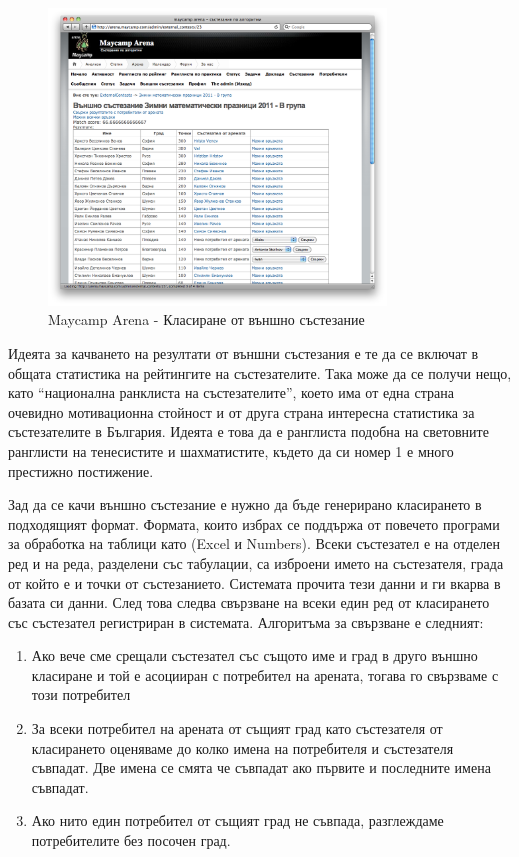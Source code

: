 \documentclass[a4paper,12pt]{article}
\begin{document}
  \begin{figure}[ht]
    \begin{center}
      \includegraphics[width=0.8\textwidth]{maycamp_arena_external_ranklist.png}
    \end{center}
    \caption{Maycamp Arena - Класиране от външно състезание}
    \label{arena_external_ranklist}
  \end{figure}
  
  Идеята за качването на резултати от външни състезания е те да се включат в общата статистика на рейтингите на състезателите. Така може да се получи нещо, като ``национална ранклиста на състезателите'', което има от една страна очевидно мотивационна стойност и от друга страна интересна статистика за състезателите в България. Идеята е това да е ранглиста подобна на световните ранглисти на тенесистите и шахматистите, където да си номер 1 е много престижно постижение.
  
  Зад да се качи външно състезание е нужно да бъде генерирано класирането в подходящият формат. Формата, които избрах се поддържа от повечето програми за обработка на таблици като (Excel и Numbers). Всеки състезател е на отделен ред и на реда, разделени със табулации, са изброени името на състезателя, града от който е и точки от състезанието. Системата прочита тези данни и ги вкарва в базата си данни. След това следва свързване на всеки един ред от класирането със състезател регистриран в системата. Алгоритъма за свързване е следният:
  
  \begin{enumerate}
    \item Ако вече сме срещали състезател със същото име и град в друго външно класиране и той е асоцииран с потребител на арената, тогава го свързваме с този потребител
    \item За всеки потребител на арената от същият град като състезателя от класирането оценяваме до колко имена на потребителя и състезателя съвпадат. Две имена се смята че съвпадат ако първите и последните имена съвпадат.
    \item Ако нито един потребител от същият град не съвпада, разглеждаме потребителите без посочен град.
  \end{enumerate}
  
\end{document}

